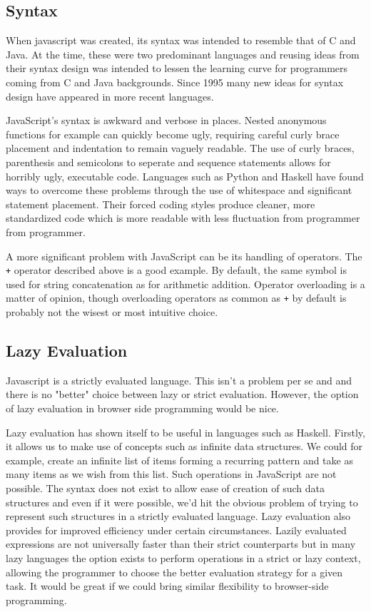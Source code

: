 \subsection{Syntax}
When javascript was created, its syntax was intended to resemble that 
of C and Java. At the time, these were two predominant languages and
reusing ideas from their syntax design was intended to lessen the 
learning curve for programmers coming from C and Java backgrounds.
Since 1995 many new ideas for syntax design have appeared in more
recent languages. 

JavaScript's syntax is awkward and verbose in places. Nested 
anonymous functions for example can quickly become ugly, requiring
careful curly brace placement and indentation to remain vaguely
readable. The use of curly braces, parenthesis and semicolons to
seperate and sequence statements allows for horribly ugly, executable
code. Languages such as Python and Haskell have found ways
to overcome these problems through the use of whitespace and significant
statement placement. Their forced coding styles produce cleaner, more
standardized code which is more readable with less fluctuation from
programmer from programmer. 

A more significant problem with JavaScript can be its handling of
operators. The \verb!+! operator described above is a good
example. By default, the same symbol is used for string concatenation
as for arithmetic addition. Operator overloading is a matter of opinion,
though overloading operators as common as \verb!+! by default is probably
not the wisest or most intuitive choice. 

\subsection{Lazy Evaluation}
Javascript is a strictly evaluated language. This isn't a problem per
se and and there is no "better" choice between lazy or strict evaluation.
However, the option of lazy evaluation in browser side programming would
be nice. 

Lazy evaluation has shown itself to be useful in languages such as
Haskell. Firstly, it allows us to make use of concepts such as infinite
data structures. We could for example, create an infinite list of items
forming a recurring pattern and take as many items as we wish from this
list. Such operations in JavaScript are not possible. The syntax does
not exist to allow ease of creation of such data structures and even if
it were possible, we'd hit the obvious problem of trying to represent
such structures in a strictly evaluated language. Lazy evaluation also
provides for improved efficiency under certain circumstances. Lazily
evaluated expressions are not universally faster than their strict
counterparts but in many lazy languages the option exists to perform
operations in a strict or lazy context, allowing the programmer to choose
the better evaluation strategy for a given task. It would be great if
we could bring similar flexibility to browser-side programming.



